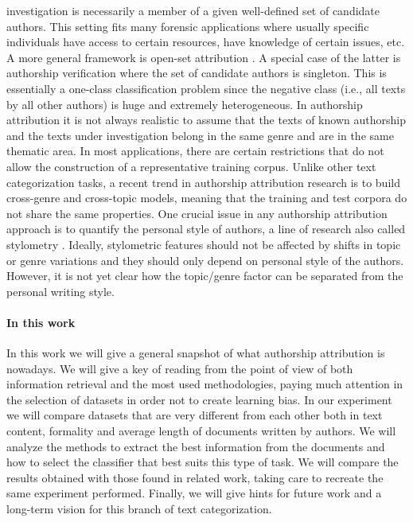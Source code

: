 investigation is necessarily a member of a given
well-defined set of candidate authors. This setting fits many forensic applications where usually specific individuals have access to certain resources, have knowledge of certain issues, etc.
A more general framework is open-set attribution \cite{koppel2011authorship}. A special case of the latter is authorship verification where the set of candidate authors is singleton. This is essentially a one-class classification problem since the negative class (i.e., all texts by all other authors) is huge and extremely heterogeneous.
In authorship attribution it is not always realistic to assume that the texts of known authorship and the texts under investigation belong in
the same genre and are in the same thematic area.
In most applications, there are certain restrictions
that do not allow the construction of a representative training corpus. Unlike other text categorization tasks, a recent trend in authorship attribution research is to build cross-genre and cross-topic models, meaning that the training and test
corpora do not share the same properties.
One crucial issue in any authorship attribution approach is to quantify the personal style of authors, a line of research also called stylometry \cite{stamatatos2009survey}. Ideally, stylometric features should not be affected by shifts in topic or
genre variations and they should only depend on
personal style of the authors. However, it is not
yet clear how the topic/genre factor can be separated from the personal writing style.

\paragraph{In this work} In this work we will give a general snapshot of what authorship attribution is nowadays. We will give a key of reading from the point of view of both information retrieval and the most used methodologies, paying much attention in the selection of datasets in order not to create learning bias.
In our experiment we will compare datasets that are very different from each other both in text content, formality and average length of documents written by authors.
We will analyze the methods to extract the best information from the documents and how to select the classifier that best suits this type of task.
We will compare the results obtained with those found in related work, taking care to recreate the same experiment performed.
Finally, we will give hints for future work and a long-term vision for this branch of text categorization.

